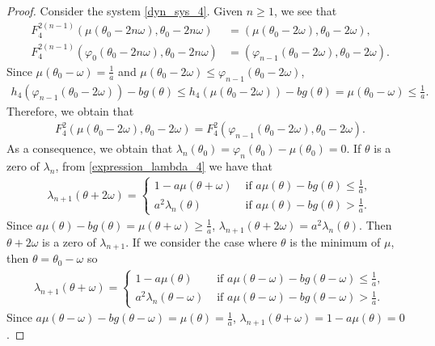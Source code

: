 \documentclass[10pt,a4paper]{amsart}
\begin{document}
\begin{proof}
    Consider the system \eqref{dyn_sys_4}.
    Given $n\geq 1$, we see that
    \begin{align*}
        F_{4}^{2(n-1)}(\mu(\theta_0-2n\omega),\theta_0-2n\omega) &= (\mu(\theta_0-2\omega),\theta_0-2\omega),\\
        F_{4}^{2(n-1)}(\varphi_0(\theta_0-2n\omega),\theta_0-2n\omega) &= (\varphi_{n-1}(\theta_0-2\omega),\theta_0-2\omega).
    \end{align*}
    Since $\mu(\theta_0-\omega)=\frac{1}{a}$ and $\mu(\theta_0-2\omega)\leq \varphi_{n-1}(\theta_0-2\omega)$,
    \begin{align*}
        h_4(\varphi_{n-1}(\theta_0-2\omega))-b g(\theta)\leq h_4(\mu(\theta_0-2\omega))-b g(\theta) = \mu(\theta_0-\omega) \leq \frac{1}{a}.
    \end{align*}
    Therefore, we obtain that
    \begin{align*}
        F_{4}^2(\mu(\theta_0-2\omega),\theta_0-2\omega) = F_{4}^2(\varphi_{n-1}(\theta_0-2\omega),\theta_0-2\omega).
    \end{align*}
    As a consequence, we obtain that $\lambda_n(\theta_0)=\varphi_n(\theta_0)-\mu(\theta_0)=0$. If $\theta$ is a zero of $\lambda_n$, from \eqref{expression_lambda_4} we have that
    \begin{align*}
        \lambda_{n+1}(\theta+2\omega) = 
        \begin{cases}
            1 - a\mu(\theta+\omega) &\text{ if }a\mu(\theta) - b g(\theta)\leq\frac{1}{a},\\
            a^2\lambda_n(\theta) &\text{ if }a\mu(\theta) - b g(\theta)>\frac{1}{a}.
        \end{cases}
    \end{align*}
    Since $a\mu(\theta) - b g(\theta) = \mu(\theta+\omega)\geq\frac{1}{a}$, $\lambda_{n+1}(\theta+2\omega)=a^2\lambda_n(\theta)$. Then $\theta+2\omega$ is a zero of $\lambda_{n+1}$. 
    If we consider the case where $\theta$ is the minimum of $\mu$, then $\theta=\theta_0-\omega$ so
    \begin{align*}
        \lambda_{n+1}(\theta+\omega) = 
        \begin{cases}
            1 - a\mu(\theta) &\text{ if }a\mu(\theta-\omega) - b g(\theta-\omega)\leq\frac{1}{a},\\
            a^2\lambda_n(\theta-\omega) &\text{ if }a\mu(\theta-\omega) - b g(\theta-\omega)>\frac{1}{a}.
        \end{cases}
    \end{align*}
    Since $a\mu(\theta-\omega) - b g(\theta-\omega) = \mu(\theta) = \frac{1}{a}$, $\lambda_{n+1}(\theta+\omega) = 1 - a\mu(\theta) = 0$.
    

\end{proof}
\end{document}
